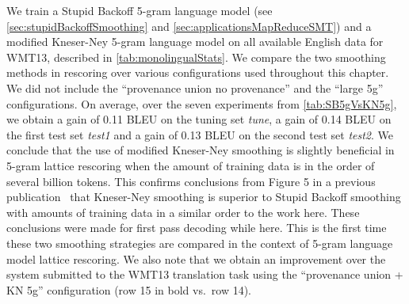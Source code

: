We train a Stupid Backoff 5-gram language
model (see \autoref{sec:stupidBackoffSmoothing}
and \autoref{sec:applicationsMapReduceSMT})
and a modified Kneser-Ney 5-gram language model on all available
English data for WMT13, described in \autoref{tab:monolingualStats}.
We compare the two smoothing methods in rescoring over various
configurations used throughout this chapter. We did not include
the ``provenance union no provenance'' and the ``large 5g'' configurations.
On average, over the seven experiments from \autoref{tab:SB5gVsKN5g},
we obtain a gain of 0.11 BLEU on the tuning set \emph{tune}, a gain of
0.14 BLEU on the first
test set \emph{test1} and a gain of
0.13 BLEU on the second test set \emph{test2}. We conclude that the
use of modified Kneser-Ney smoothing is slightly beneficial in 5-gram
lattice rescoring when the amount of training data is in the order
of several billion tokens. This confirms conclusions from
Figure 5 in a previous publication~\citep{brants-popat-xu-och-dean:2007:EMNLP-CoNLL}
that Kneser-Ney smoothing is superior to Stupid Backoff smoothing
with amounts of training data in a similar order to the work here. These
conclusions were made for first pass decoding while here. This is
the first time these two smoothing strategies are compared
in the context of 5-gram language model lattice rescoring.
We also note that we obtain an improvement over the system submitted to the WMT13 translation
task using the ``provenance union + KN 5g'' configuration (row 15 in bold vs.\ row 14).
%
